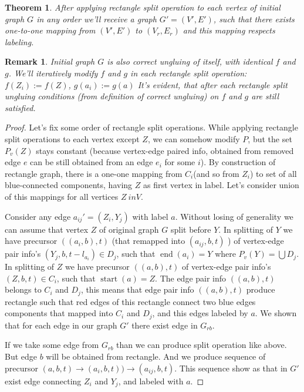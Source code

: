 \documentclass[12pt,a4paper,oneside]{article}
\newtheorem{theorem}{Theorem}
\newtheorem{remark}{Remark}
\begin{document}
\begin{theorem}
  After applying rectangle split operation to each vertex of initial graph $G$ in any order we'll receive a graph $G' = (V', E')$, such that there exists one-to-one mapping from $(V', E')$ to $(V_r, E_r)$ and this mapping respects labeling.
\end{theorem}
\begin{remark}
 Initial graph $G$ is also correct ungluing of itself, with identical $f$ and $g$. We'll iteratively modify $f$ and $g$ in each rectangle split operation:
$f(Z_i):= f(Z)$, $g(a_i):= g(a)$
 It's evident, that after each rectangle split ungluing conditions (from definition of correct ungluing) on $f$ and $g$ are still satisfied.
\end{remark}
\begin{proof}
Let's fix some order of rectangle split operations.
While applying rectangle split operations to each vertex except $Z$, we can somehow modify $P$, but the set $P_v(Z)$ stays constant (because vertex-edge paired info, obtained from removed edge $e$ can be still obtained from an edge $e_i$ for some $i$). By construction of rectangle graph, there is a one-one mapping from $C_i$(and so from $Z_i$) to set of all blue-connected components, having $Z$ as first vertex in label. Let's consider union of this mappings for all vertices $Z \ in V$. 

Consider any edge $a_{ij}'=(Z_i, Y_j)$ with label $a$. 
Without losing of generality we can assume that vertex $Z$ of original graph $G$ split before $Y$. In splitting of $Y$ we have precursor $((a_{i}, b), t)$ (that remapped into $(a_{ij}, b, t)$ ) of vertex-edge pair info's $(Y_j, b, t-l_{a_i}) \in D_j$, such that $\mathop{end}(a_{i}) = Y$ where $P_v(Y) = \bigcup D_j$. In splitting of $Z$ we have precursor $((a, b), t)$ of vertex-edge pair info's $(Z, b, t) \in C_i$, such that $\mathop{start}(a) = Z$. The edge pair info $((a, b), t)$ belongs to $C_i$ and $D_j$, this means that edge pair info $((a, b), t)$ produce rectangle such that red edges of this rectangle connect two blue edges  components that mapped into $C_i$ and $D_j$, and this edges labeled by $a$. We shown that for each edge in our graph $G'$ there exist edge in $G_{rb}$.

If we take some edge from $G_{rb}$ than we can produce split operation like above. But edge $b$ will be obtained from rectangle. And we produce sequence of precursor $(a,b,t)\rightarrow (a_i,b,t))\rightarrow (a_{ij},b,t)$. This sequence show as that in $G'$ exist edge connecting $Z_i$ and $Y_j$, and labeled with $a$. 
\end{proof}
\end{document}
